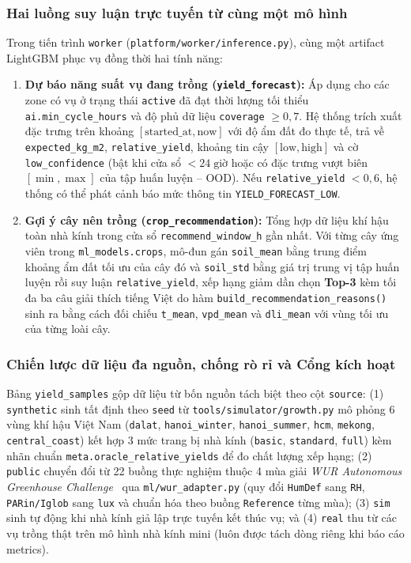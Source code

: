 \subsubsection{Hai luồng suy luận trực tuyến từ cùng một mô hình}

Trong tiến trình \texttt{worker} (\texttt{platform/worker/inference.py}), cùng một artifact LightGBM phục vụ đồng thời hai tính năng:
\begin{enumerate}[leftmargin=*]
    \item \textbf{Dự báo năng suất vụ đang trồng (\texttt{yield\_forecast}):} Áp dụng cho các zone có vụ ở trạng thái \texttt{active} đã đạt thời lượng tối thiểu \texttt{ai.min\_cycle\_hours} và độ phủ dữ liệu \texttt{coverage} \(\ge 0{,}7\). Hệ thống trích xuất đặc trưng trên khoảng \([\text{started\_at}, \text{now}]\) với độ ẩm đất đo thực tế, trả về \texttt{expected\_kg\_m2}, \texttt{relative\_yield}, khoảng tin cậy \([\text{low}, \text{high}]\) và cờ \texttt{low\_confidence} (bật khi cửa sổ \(< 24\;\text{giờ}\) hoặc có đặc trưng vượt biên \([\min, \max]\) của tập huấn luyện -- OOD). Nếu \texttt{relative\_yield} \(< 0{,}6\), hệ thống có thể phát cảnh báo mức thông tin \texttt{YIELD\_FORECAST\_LOW}.
    \item \textbf{Gợi ý cây nên trồng (\texttt{crop\_recommendation}):} Tổng hợp dữ liệu khí hậu toàn nhà kính trong cửa sổ \texttt{recommend\_window\_h} gần nhất. Với từng cây ứng viên trong \texttt{ml\_models.crops}, mô-đun gán \texttt{soil\_mean} bằng trung điểm khoảng ẩm đất tối ưu của cây đó và \texttt{soil\_std} bằng giá trị trung vị tập huấn luyện rồi suy luận \texttt{relative\_yield}, xếp hạng giảm dần chọn \textbf{Top-3} kèm tối đa ba câu giải thích tiếng Việt do hàm \texttt{build\_recommendation\_reasons()} sinh ra bằng cách đối chiếu \texttt{t\_mean}, \texttt{vpd\_mean} và \texttt{dli\_mean} với vùng tối ưu của từng loài cây.
\end{enumerate}

\subsubsection{Chiến lược dữ liệu đa nguồn, chống rò rỉ và Cổng kích hoạt}

Bảng \texttt{yield\_samples} gộp dữ liệu từ bốn nguồn tách biệt theo cột \texttt{source}: (1) \texttt{synthetic} sinh tất định theo \texttt{seed} từ \texttt{tools/simulator/growth.py} mô phỏng 6 vùng khí hậu Việt Nam (\texttt{dalat}, \texttt{hanoi\_winter}, \texttt{hanoi\_summer}, \texttt{hcm}, \texttt{mekong}, \texttt{central\_coast}) kết hợp 3 mức trang bị nhà kính (\texttt{basic}, \texttt{standard}, \texttt{full}) kèm nhãn chuẩn \texttt{meta.oracle\_relative\_yields} để đo chất lượng xếp hạng; (2) \texttt{public} chuyển đổi từ 22 buồng thực nghiệm thuộc 4 mùa giải \textit{WUR Autonomous Greenhouse Challenge}~\cite{wurChallengeDataset} qua \texttt{ml/wur\_adapter.py} (quy đổi \texttt{HumDef} sang \texttt{RH}, \texttt{PARin/Iglob} sang \texttt{lux} và chuẩn hóa theo buồng \texttt{Reference} từng mùa); (3) \texttt{sim} sinh tự động khi nhà kính giả lập trực tuyến kết thúc vụ; và (4) \texttt{real} thu từ các vụ trồng thật trên mô hình nhà kính mini (luôn được tách dòng riêng khi báo cáo metrics).

